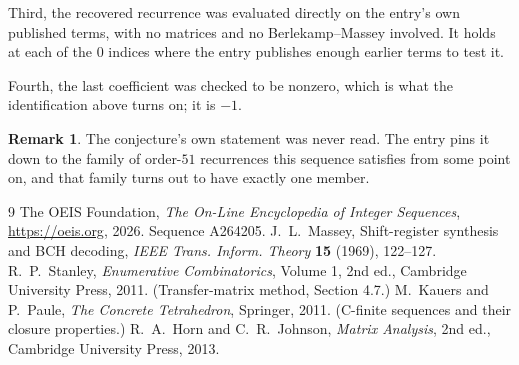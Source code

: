 \documentclass[11pt,a4paper]{article}
\theoremstyle{plain}
\theoremstyle{definition}
\newtheorem{remark}[theorem]{Remark}
\begin{document}
Third, the recovered recurrence was evaluated directly on the entry's own published terms, with
no matrices and no Berlekamp--Massey involved. It holds at each of the $0$ indices where
the entry publishes enough earlier terms to test it.

Fourth, the last coefficient was checked to be nonzero, which is what the identification above
turns on; it is $-1$.

\begin{remark}
The conjecture's own statement was never read. The entry pins it down to the family of
order-$51$ recurrences this sequence satisfies from some point on, and that family turns
out to have exactly one member.
\end{remark}

\begin{thebibliography}{9}
 The OEIS Foundation, \emph{The On-Line Encyclopedia of Integer
Sequences}, \url{https://oeis.org}, 2026. Sequence A264205.
 J.~L.~Massey, Shift-register synthesis and BCH decoding, \emph{IEEE
Trans. Inform. Theory} \textbf{15} (1969), 122--127.
 R.~P.~Stanley, \emph{Enumerative Combinatorics}, Volume 1, 2nd ed.,
Cambridge University Press, 2011. (Transfer-matrix method, Section 4.7.)
 M.~Kauers and P.~Paule, \emph{The Concrete Tetrahedron}, Springer, 2011.
(C-finite sequences and their closure properties.)
 R.~A.~Horn and C.~R.~Johnson, \emph{Matrix Analysis}, 2nd ed., Cambridge
University Press, 2013.
\end{thebibliography}
\end{document}
